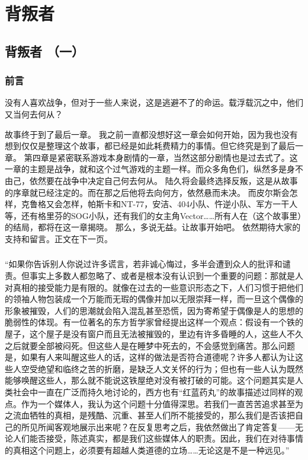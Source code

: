 \part{背叛者}
\chapter{背叛者 （一）}
\section*{前言}
没有人喜欢战争，但对于一些人来说，这是逃避不了的命运。载浮载沉之中，他们又当何去何从？

\lineseparator

故事终于到了最后一章。
我之前一直都没想好这一章会如何开始，因为我也没有想到仅仅是整理这个故事，都已经是如此耗费精力的事情。但它终究是到了最后一章。
第四章是紧密联系游戏本身剧情的一章，当然这部分剧情也是过去式了。这一章的主题是战争，就和这个过气游戏的主题一样。而众多角色们，纵然多是身不由己，依然要在战争中决定自己何去何从。
陆久将会最终选择反叛，这是从故事的序章就已经注定的。而在那之后他将去向何方，依然悬而未决。
而皮尔斯会怎样，克鲁格又会怎样，帕斯卡和NT-77，安洁、404小队、忤逆小队、军方一干人等，还有格里芬的SOG小队，还有我们的女主角Vector……所有人在（这个故事里）的结局，都将在这一章揭晓。
那么，多说无益。让故事开始吧。
依然期待大家的支持和留言。正文在下一页。

\lineseparator


\section*{}

\begin{QuoteEnv}{}
“如果你告诉别人你说过许多谎言，若非诚心悔过，多半会遭到众人的批评和谴责。但事实上多数人都忽略了、或者是根本没有认识到一个重要的问题：那就是人对真相的接受能力是有限的。就像在过去的一些意识形态之下，人们习惯于把他们的领袖人物包装成一个万能而无瑕的偶像并加以无限崇拜一样，而一旦这个偶像的形象被摧毁，人们的思潮就会陷入混乱甚至恐慌，因为寄希望于偶像是人的思想的脆弱性的体现。有一位著名的东方哲学家曾经提出这样一个观点：假设有一个铁的屋子，这个屋子是没有窗户而且无法被摧毁的，里边有许多昏睡的人，这些人不久之后就要全部被闷死。但这些人是在睡梦中死去的，不会感觉到痛苦。那么问题是，如果有人来叫醒这些人的话，这样的做法是否符合道德呢？许多人都认为让这些人空受绝望和临终之苦的折磨，是缺乏人文关怀的行为；但也有一些人认为既然能够唤醒这些人，那么就不能说这铁屋绝对没有被打破的可能。这个问题其实是人类社会中一直在广泛而持久地讨论的，西方也有“红蓝药丸”的故事描述过同样的观点。作为一个媒体人，我认为这个问题十分值得深思。若我们一直苦苦追求甚至为之流血牺牲的真相，是残酷、沉重、甚至人们所不能接受的，那么我们是否该把自己的所见所闻客观地展示出来呢？在反复思考之后，我依然做出了肯定答复——无论人们能否接受，陈述真实，都是我们这些媒体人的职责。因此，我们在对待事情的真相这个问题上，必须要有超越人类道德的立场……无论这是不是一种远见。”
\end{QuoteEnv}

